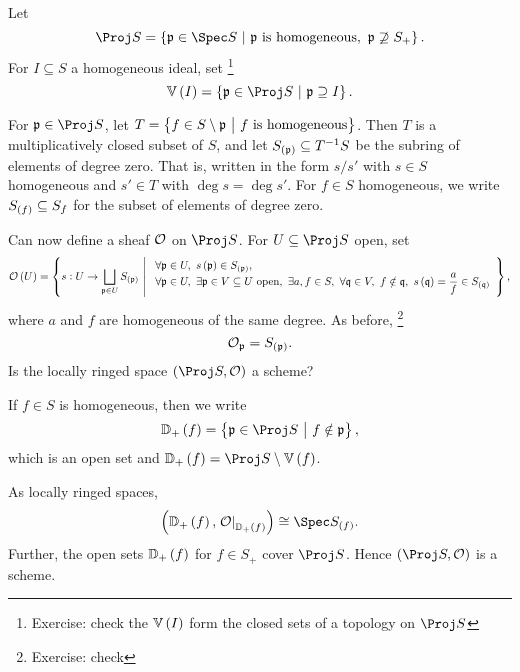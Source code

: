 \begin{definition*}
Let
$$ \Proj S = \cbr{\ppp \in \Spec S \st \ppp \ \text{is homogeneous}, \ \ppp \not\supseteq S_+}. $$
For $ I \subseteq S $ a homogeneous ideal, set \footnote{Exercise: check the $ \VV\br{I} $ form the closed sets of a topology on $ \Proj S $}
$$ \VV\br{I} = \cbr{\ppp \in \Proj S \st \ppp \supseteq I}. $$
\end{definition*}

\pagebreak


\begin{notation*}
For $ \ppp \in \Proj S $, let $ T = \cbr{f \in S \setminus \ppp \st f \ \text{is homogeneous}} $. Then $ T $ is a multiplicatively closed subset of $ S $, and let $ S_{\br{\ppp}} \subseteq T^{-1}S $ be the subring of elements of degree zero. That is, written in the form $ s / s' $ with $ s \in S $ homogeneous and $ s' \in T $ with $ \deg s = \deg s' $. For $ f \in S $ homogeneous, we write $ S_{\br{f}} \subseteq S_f $ for the subset of elements of degree zero.
\end{notation*}

Can now define a sheaf $ \mathcal{O} $ on $ \Proj S $. For $ U \subseteq \Proj S $ open, set
$$ \OOO\br{U} = \cbr{s : U \to \bigsqcup_{\ppp \in U} S_{\br{\ppp}} \st \begin{array}{l} \forall \ppp \in U, \ s\br{\ppp} \in S_{\br{\ppp}}, \\ \forall \ppp \in U, \ \exists \ppp \in V \subseteq U \ \text{open}, \ \exists a, f \in S, \ \forall \qqq \in V, \ f \notin \qqq, \ s\br{\qqq} = \dfrac{a}{f} \in S_{\br{\qqq}} \end{array}}, $$
where $ a $ and $ f $ are homogeneous of the same degree. As before, \footnote{Exercise: check}
$$ \OOO_\ppp = S_{\br{\ppp}}. $$
Is the locally ringed space $ \br{\Proj S, \OOO} $ a scheme?

\begin{notation*}
If $ f \in S $ is homogeneous, then we write
$$ \DD_+\br{f} = \cbr{\ppp \in \Proj S \st f \notin \ppp}, $$
which is an open set and $ \DD_+\br{f} = \Proj S \setminus \VV\br{f} $.
\end{notation*}

\begin{proposition}
As locally ringed spaces,
$$ \br{\DD_+\br{f}, \eval{\OOO}_{\DD_+\br{f}}} \cong \Spec S_{\br{f}}. $$
Further, the open sets $ \DD_+\br{f} $ for $ f \in S_+ $ cover $ \Proj S $. Hence $ \br{\Proj S, \OOO} $ is a scheme.
\end{proposition}

